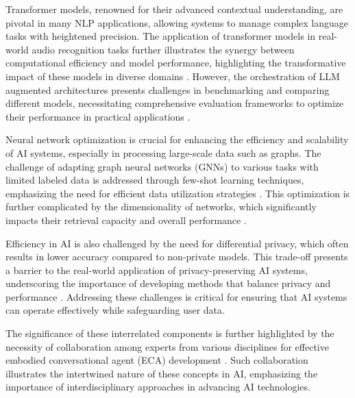 Transformer models, renowned for their advanced contextual understanding, are pivotal in many NLP applications, allowing systems to manage complex language tasks with heightened precision. The application of transformer models in real-world audio recognition tasks further illustrates the synergy between computational efficiency and model performance, highlighting the transformative impact of these models in diverse domains \cite{zhu2024deformableaudiotransformeraudio}. However, the orchestration of LLM augmented architectures presents challenges in benchmarking and comparing different models, necessitating comprehensive evaluation frameworks to optimize their performance in practical applications \cite{touvron2023llama}.



Neural network optimization is crucial for enhancing the efficiency and scalability of AI systems, especially in processing large-scale data such as graphs. The challenge of adapting graph neural networks (GNNs) to various tasks with limited labeled data is addressed through few-shot learning techniques, emphasizing the need for efficient data utilization strategies \cite{ge2024psppretrainingstructureprompt}. This optimization is further complicated by the dimensionality of networks, which significantly impacts their retrieval capacity and overall performance \cite{koyama2001storagecapacitytwodimensionalneural}.



Efficiency in AI is also challenged by the need for differential privacy, which often results in lower accuracy compared to non-private models. This trade-off presents a barrier to the real-world application of privacy-preserving AI systems, underscoring the importance of developing methods that balance privacy and performance \cite{kasneci2023chatgpt}. Addressing these challenges is critical for ensuring that AI systems can operate effectively while safeguarding user data.



The significance of these interrelated components is further highlighted by the necessity of collaboration among experts from various disciplines for effective embodied conversational agent (ECA) development \cite{korre2023takesvillagemultidisciplinaritycollaboration}. Such collaboration illustrates the intertwined nature of these concepts in AI, emphasizing the importance of interdisciplinary approaches in advancing AI technologies.















